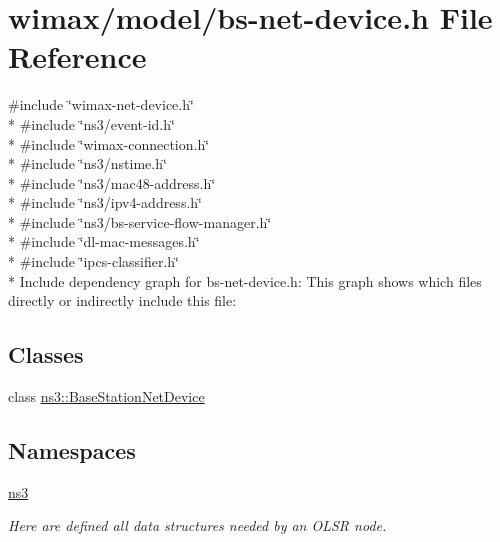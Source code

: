 \hypertarget{bs-net-device_8h}{}\section{wimax/model/bs-\/net-\/device.h File Reference}
\label{bs-net-device_8h}
{\ttfamily \#include \char`\"{}wimax-\/net-\/device.\+h\char`\"{}}\\*
{\ttfamily \#include \char`\"{}ns3/event-\/id.\+h\char`\"{}}\\*
{\ttfamily \#include \char`\"{}wimax-\/connection.\+h\char`\"{}}\\*
{\ttfamily \#include \char`\"{}ns3/nstime.\+h\char`\"{}}\\*
{\ttfamily \#include \char`\"{}ns3/mac48-\/address.\+h\char`\"{}}\\*
{\ttfamily \#include \char`\"{}ns3/ipv4-\/address.\+h\char`\"{}}\\*
{\ttfamily \#include \char`\"{}ns3/bs-\/service-\/flow-\/manager.\+h\char`\"{}}\\*
{\ttfamily \#include \char`\"{}dl-\/mac-\/messages.\+h\char`\"{}}\\*
{\ttfamily \#include \char`\"{}ipcs-\/classifier.\+h\char`\"{}}\\*
Include dependency graph for bs-\/net-\/device.h\+:
This graph shows which files directly or indirectly include this file\+:
\subsection*{Classes}
\begin{DoxyCompactItemize}
\item 
class \hyperlink{classns3_1_1BaseStationNetDevice}{ns3\+::\+Base\+Station\+Net\+Device}
\end{DoxyCompactItemize}
\subsection*{Namespaces}
\begin{DoxyCompactItemize}
\item 
 \hyperlink{namespacens3}{ns3}
\begin{DoxyCompactList}\small\item\em Here are defined all data structures needed by an O\+L\+SR node. \end{DoxyCompactList}\end{DoxyCompactItemize}
